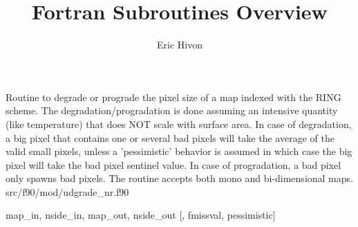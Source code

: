 
\sloppy


\title{\healpix Fortran Subroutines Overview}
 \section[udgrade\_ring*]{ }
\label{sub:udgrade_ring}
\author{Eric Hivon}


\begin{facility}
{Routine to degrade or prograde the pixel size of a \healpix map indexed with
  the RING scheme. The degradation/progradation is done assuming an
intensive quantity (like temperature) that does NOT scale with surface area. \newline
In case of degradation, a big pixel that contains one or several bad pixels will
take the average of the valid small pixels, unless a 'pessimistic' behavior
is assumed in which case the big pixel will take the bad pixel sentinel value.
In case of progradation, a bad pixel only spawns bad pixels.\newline
The routine accepts both mono and bi-dimensional maps.
}
{src/f90/mod/udgrade\_nr.f90}
\end{facility}

\begin{f90format}
{map\_in, nside\_in, map\_out, nside\_out [, fmissval, pessimistic]}
\end{f90format}


